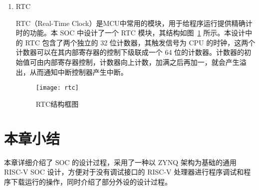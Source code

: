 \begin{enumerate}
    \item RTC
    
    RTC（Real-Time Clock）是MCU中常用的模块，用于给程序运行提供精确计时的功能。本 SOC 中设计了一个 RTC 模块，其结构如图~\ref{fig:rtc} 所示。本设计中的 RTC 包含了两个独立的 32 位计数器，其触发信号为 CPU 的时钟，这两个计数器可以在其内部寄存器的控制下级联成一个 64 位的计数器。计数器的初始值可由内部寄存器控制，计数器向上计数，加满之后再加一，就会产生溢出，从而通知中断控制器产生中断。
    
    \begin{figure}[htbp]
        \centering
        \texttt{[image: rtc]}
        \caption{RTC结构框图}
        \label{fig:rtc}
    \end{figure}
    
    
\end{enumerate}

\section{本章小结}

本章详细介绍了 SOC 的设计过程，采用了一种以 ZYNQ 架构为基础的通用 RISC-V SOC 设计，方便对于没有调试接口的 RISC-V 处理器进行程序调试和程序下载运行的操作，同时介绍了部分外设的设计过程。

